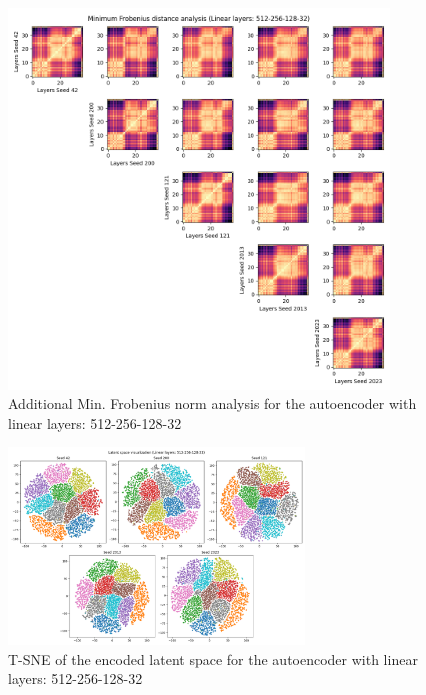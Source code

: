 \documentclass[../main.tex]{subfiles}
\begin{document}
%
\begin{figure}[ht!]
    \centering
    \includegraphics[width=0.9\textwidth]{figures/rs/sim_ae/frob_512-256-128-32__42_200_121_2013_2023.png}
    \caption{Additional Min. Frobenius norm analysis for the autoencoder with linear layers: 512-256-128-32}
    \label{fig:extra_frob_ae_512_256_128_32}
\end{figure}
%
\begin{figure}[ht!]
    \centering
    \includegraphics[width=0.7\textwidth]{figures/rs/sim_ae/vis_tsne_512-256-128-32__42_200_121_2013_2023.png} 
    \caption{T-SNE of the encoded latent space for the autoencoder with linear layers: 512-256-128-32}
    \label{fig:tsne_ae_512_256_128_32}
\end{figure}
%
\end{document}
